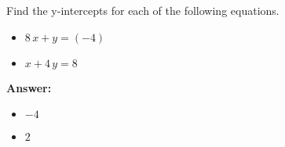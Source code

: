  Find the y-intercepts for each of the following equations. \begin{itemize}\item \( 8 \, x + y = \left(-4\right) \)\item \( x + 4 \, y = 8 \)\end{itemize}

        \textbf{Answer:} \begin{itemize}\item \( -4 \)\item \( 2 \)\end{itemize}
